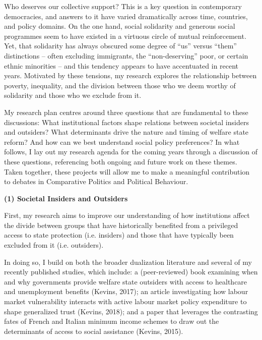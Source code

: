 \documentclass[letterpaper]{scrartcl}
\begin{document}
  \raggedbottom

  Who deserves our collective support? This is a key question in contemporary democracies, and answers to it have varied dramatically across time, countries, and policy domains. On the one hand, social solidarity and generous social programmes seem to have existed in a virtuous circle of mutual reinforcement. Yet, that solidarity has always obscured some degree of ``us'' versus ``them'' distinctions -- often excluding immigrants, the ``non-deserving'' poor, or certain ethnic minorities -- and this tendency appears to have accentuated in recent years. Motivated by these tensions, my research explores the relationship between poverty, inequality, and the division between those who we deem worthy of solidarity and those who we exclude from it.

  My research plan centres around three questions that are fundamental to these discussions: What institutional factors shape relations between societal insiders and outsiders? What determinants drive the nature and timing of welfare state reform? And how can we best understand social policy preferences? In what follows, I lay out my research agenda for the coming years through a discussion of these questions, referencing both ongoing and future work on these themes. Taken together, these projects will allow me to make a meaningful contribution to debates in Comparative Politics and Political Behaviour.

  \textbf{(1) Societal Insiders and Outsiders}
  \vspace{-1em}

  First, my research aims to improve our understanding of how institutions affect the divide between groups that have historically benefited from a privileged access to state protection (i.e. insiders) and those that have typically been excluded from it (i.e. outsiders).

  In doing so, I build on both the broader dualization literature and several of my recently published studies, which include: a (peer-reviewed) book examining when and why governments provide welfare state outsiders with access to healthcare and unemployment benefits (Kevins, 2017); an article investigating how labour market vulnerability interacts with active labour market policy expenditure to shape generalized trust (Kevins, 2018); and a paper that leverages the contrasting fates of French and Italian minimum income schemes to draw out the determinants of access to social assistance (Kevins, 2015).
\end{document}
